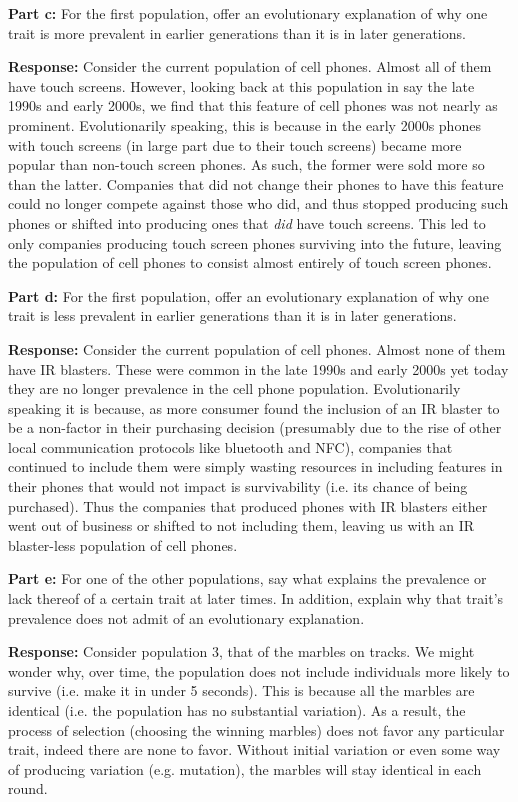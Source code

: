 \documentclass{article}
\begin{document}
\noindent\textbf{Part c:} For the first population, offer an evolutionary explanation of why one trait is more prevalent in earlier generations than it is in later generations.
\bigskip

\noindent\textbf{Response:} Consider the current population of cell phones. Almost all of them have touch screens. However, looking back at this population in say the late 1990s and early 2000s, we find that this feature of cell phones was not nearly as prominent. Evolutionarily speaking, this is because in the early 2000s phones with touch screens (in large part due to their touch screens) became more popular than non-touch screen phones. As such, the former were sold more so than the latter. Companies that did not change their phones to have this feature could no longer compete against those who did, and thus stopped producing such phones or shifted into producing ones that \textit{did} have touch screens. This led to only companies producing touch screen phones surviving into the future, leaving the population of cell phones to consist almost entirely of touch screen phones.
\bigskip

\noindent\textbf{Part d:} For the first population, offer an evolutionary explanation of why one trait is less prevalent in earlier generations than it is in later generations.
\bigskip

\noindent\textbf{Response:} Consider the current population of cell phones. Almost none of them have IR blasters. These were common in the late 1990s and early 2000s yet today they are no longer prevalence in the cell phone population. Evolutionarily speaking it is because, as more consumer found the inclusion of an IR blaster to be a non-factor in their purchasing decision (presumably due to the rise of other local communication protocols like bluetooth and NFC), companies that continued to include them were simply wasting resources in including features in their phones that would not impact is survivability (i.e. its chance of being purchased). Thus the companies that produced phones with IR blasters either went out of business or shifted to not including them, leaving us with an IR blaster-less population of cell phones.
\bigskip

\noindent\textbf{Part e:} For one of the other populations, say what explains the prevalence or lack thereof of a certain trait at later times.  In addition, explain why that trait’s prevalence does not admit of an evolutionary explanation.
\bigskip

\noindent\textbf{Response:} Consider population 3, that of the marbles on tracks. We might wonder why, over time, the population does not include individuals more likely to survive (i.e. make it in under 5 seconds). This is because all the marbles are identical (i.e. the population has no substantial variation). As a result, the process of selection (choosing the winning marbles) does not favor any particular trait, indeed there are none to favor. Without initial variation or even some way of producing variation (e.g. mutation), the marbles will stay identical in each round.
\end{document}
